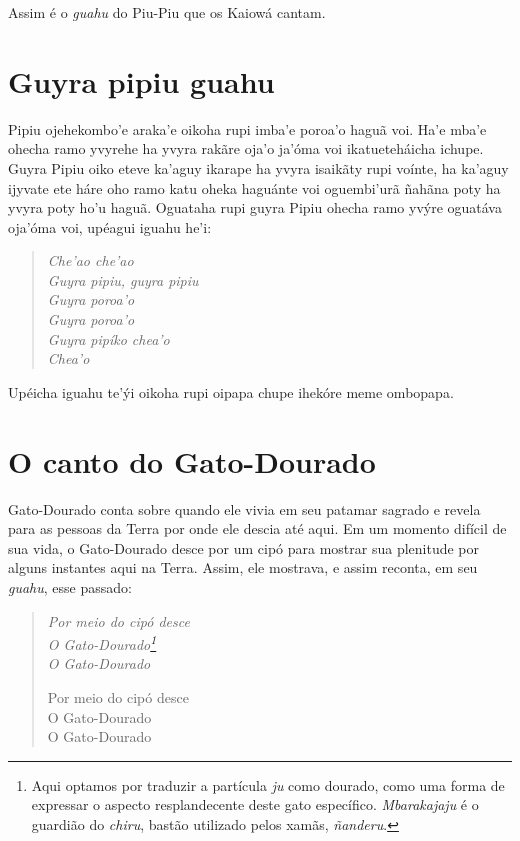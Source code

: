 Assim é o \emph{guahu} do Piu-Piu que os Kaiowá cantam.

\chapter{Guyra pipiu guahu}

 Pipiu ojehekombo'e araka'e oikoha rupi imba'e poroa'o haguã voi.
Ha'e mba'e ohecha ramo yvyrehe ha yvyra rakãre oja'o ja'óma voi
ikatueteháicha ichupe. Guyra Pipiu oiko eteve ka'aguy ikarape ha yvyra
isaikãty rupi voínte, ha ka'aguy ijyvate ete háre oho ramo katu oheka
haguánte voi oguembi'urã ñahãna poty ha yvyra poty ho'u haguã. Oguataha
rupi guyra Pipiu ohecha ramo yvýre oguatáva oja'óma voi, upéagui iguahu
he'i:

\begin{verse}
\itshape
Che'ao che'ao\\
Guyra pipiu, guyra pipiu\\
Guyra poroa'o\\
Guyra poroa'o\\
Guyra pipíko chea'o\\
Chea'o
\end{verse}

Upéicha iguahu te'ýi oikoha rupi oipapa chupe ihekóre meme ombopapa.

\chapter{O canto do Gato-Dourado}

Gato-Dourado conta sobre quando ele vivia em seu patamar sagrado e
revela para as pessoas da Terra por onde ele descia até aqui. Em um
momento difícil de sua vida, o Gato-Dourado desce por um cipó para
mostrar sua plenitude por alguns instantes aqui na Terra. Assim, ele
mostrava, e assim reconta, em seu \emph{guahu}, esse passado:

\begin{verse}
\itshape
Por meio do cipó desce\\
O Gato-Dourado\footnote{Aqui optamos por traduzir a partícula \emph{ju} como dourado, como uma forma de expressar o aspecto resplandecente deste gato específico. \emph{Mbarakajaju} é o guardião do \emph{chiru}, bastão utilizado pelos xamãs, \emph{ñanderu}.}\\
O Gato-Dourado

Por meio do cipó desce\\
O Gato-Dourado\\
O Gato-Dourado
\end{verse}

